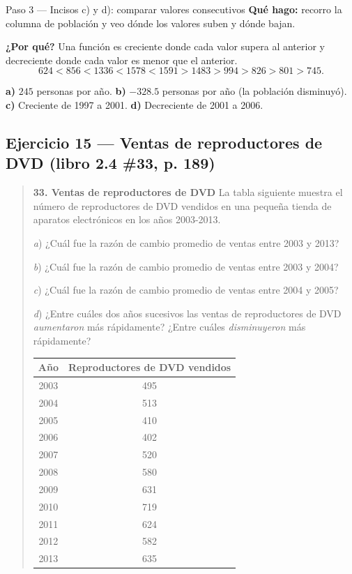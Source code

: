 \documentclass[11pt]{article}
\begin{document}
\begin{paso}{Paso 3 --- Incisos c) y d): comparar valores consecutivos}
\textbf{Qué hago:} recorro la columna de población y veo dónde los valores suben y dónde bajan.

\textbf{¿Por qué?} Una función es creciente donde cada valor supera al anterior y decreciente donde cada valor es menor que el anterior.
\[
624<856<1336<1578<1591>1483>994>826>801>745.
\]
\end{paso}

\begin{resp}
\textbf{a)} $245$ personas por año. \qquad \textbf{b)} $-328.5$ personas por año (la población disminuyó).\\
\textbf{c)} Creciente de 1997 a 2001. \qquad \textbf{d)} Decreciente de 2001 a 2006.
\end{resp}

\subsection*{Ejercicio 15 — Ventas de reproductores de DVD (libro 2.4 \#33, p. 189)}

\begin{quote}
\textbf{33. Ventas de reproductores de DVD} \; La tabla siguiente muestra el número de reproductores de DVD vendidos en una pequeña tienda de aparatos electrónicos en los años 2003-2013.

\emph{a}) ¿Cuál fue la razón de cambio promedio de ventas entre 2003 y 2013?

\emph{b}) ¿Cuál fue la razón de cambio promedio de ventas entre 2003 y 2004?

\emph{c}) ¿Cuál fue la razón de cambio promedio de ventas entre 2004 y 2005?

\emph{d}) ¿Entre cuáles dos años sucesivos las ventas de reproductores de DVD \emph{aumentaron} más rápidamente? ¿Entre cuáles \emph{disminuyeron} más rápidamente?

\begin{center}
\begin{tabular}{|c|c|}
\hline
\textbf{Año} & \textbf{Reproductores de DVD vendidos}\\
\hline
2003 & 495\\
2004 & 513\\
2005 & 410\\
2006 & 402\\
2007 & 520\\
2008 & 580\\
2009 & 631\\
2010 & 719\\
2011 & 624\\
2012 & 582\\
2013 & 635\\
\hline
\end{tabular}
\end{center}
\end{quote}
\end{document}
